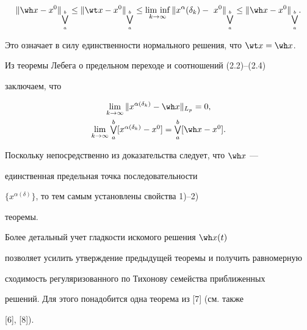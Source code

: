 \begin{pf}
\begin{equation}
\|\wh x - x^0\|_{\bigvee\limits_a^b} \le


\|\wt x - x^0\|_{\bigvee\limits_a^b} \le


\Liminf_{k\to\infty}\|x^\alpha(\delta_k) -\


x^0\|_{\bigvee\limits_a^b}


\le \|\wh x - x^0\|_{\bigvee\limits_a^b}.


\end{equation}


Это означает в силу единственности нормального решения, что $\wt x = \wh x$.





Из теоремы Лебега о предельном переходе и соотношений (2.2)--(2.4)


заключаем, что


\begin{gather*}


\lim_{k\to\infty}\|x^{\alpha(\delta_k)} - \wh x \|_{L_p}=0, \\


%


\lim \limits_{k\to\infty}


\textstyle\bigvee\limits_a^b[x^{\alpha(\delta_k)} - x^0]


=\textstyle\bigvee \limits_a^b[\wh x-x^0].


\end{gather*}


Поскольку непосредственно из доказательства следует, что $\wh x$ ---


единственная предельная точка последовательности


$\{x^{\alpha(\delta)}\}$, то тем самым установлены свойства 1)--2)


теоремы.


\end{pf}





Более детальный учет гладкости искомого решения $\wh x(t)$


позволяет усилить утверждение предыдущей теоремы и получить равномерную


сходимость регуляризованного по Тихонову семейства приближенных


решений. Для этого понадобится одна теорема из [7] (см. также


[6], [8]).





